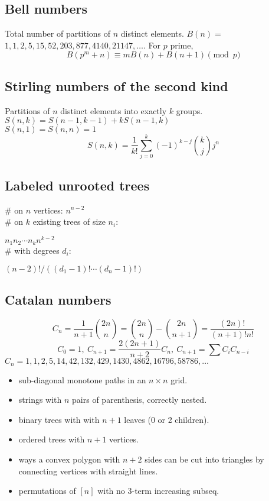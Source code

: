 	\subsection{Bell numbers}
		Total number of partitions of $n$ distinct elements. $B(n) =$
		$1, 1, 2, 5, 15, 52, 203, 877, 4140, 21147, \dots$. For $p$ prime,
		\[ B(p^m+n)\equiv mB(n)+B(n+1) \pmod{p} \]

		\subsection{Stirling numbers of the second kind}
		Partitions of $n$ distinct elements into exactly $k$ groups.
		$S(n,k) = S(n-1,k-1) + k S(n-1,k)$ \\
		$S(n,1) = S(n,n) = 1$\\
		$$S(n,k) = \frac{1}{k!}\sum_{j=0}^k (-1)^{k-j}\binom{k}{j}j^n$$

		\subsection{Labeled unrooted trees}
		\# on $n$ vertices: $n^{n-2}$ \\
		\# on $k$ existing trees of size $n_i$: 
            
            $n_1n_2\cdots n_k n^{k-2}$ \\

		\# with degrees $d_i$: 
            
            $(n-2)! / ((d_1-1)! \cdots (d_n-1)!)$

	\subsection{Catalan numbers}
		\[ C_n=\frac{1}{n+1}\binom{2n}{n}= \binom{2n}{n}-\binom{2n}{n+1} = \frac{(2n)!}{(n+1)!n!} \]
		\[ C_0=1,\ C_{n+1} = \frac{2(2n+1)}{n+2}C_n,\ C_{n+1}=\sum C_iC_{n-i} \]
		${C_n = 1, 1, 2, 5, 14, 42, 132, 429, 1430, 4862, 16796, 58786, \dots}$
		\begin{itemize}[noitemsep]
			\item sub-diagonal monotone paths in an $n\times n$ grid.
			\item strings with $n$ pairs of parenthesis, correctly nested.
			\item binary trees with with $n+1$ leaves (0 or 2 children).
			\item ordered trees with $n+1$ vertices.
			\item ways a convex polygon with $n+2$ sides can be cut into triangles by connecting vertices with straight lines.
			\item permutations of $[n]$ with no 3-term increasing subseq.
		\end{itemize}
